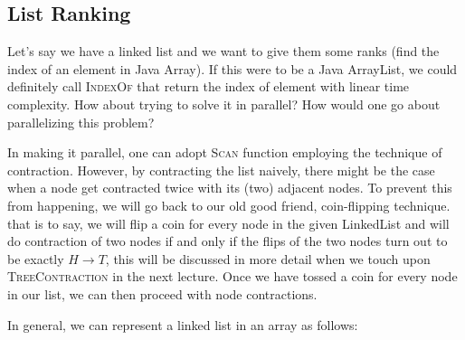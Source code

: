 \documentclass[12pt]{article}
\begin{document}
\subsection{List Ranking}
Let's say we have a linked list and we want to give them some ranks (find the index of an element in Java Array). If this were to be a Java ArrayList, we could definitely call \textsc{IndexOf} that return the index of element with linear time complexity. How about trying to solve it in parallel? How would one go about parallelizing this problem? 

In making it parallel, one can adopt \textsc{Scan} function employing the technique of contraction. However, by contracting the list naively, there might be the case when a node get contracted twice with its (two) adjacent nodes. To prevent this from happening, we will go back to our old good friend, coin-flipping technique. that is to say, we will flip a coin for every node in the given LinkedList and will do contraction of two nodes if and only if the flips of the two nodes turn out to be exactly $ H \rightarrow T$, this will be discussed in more detail when we touch upon \textsc{TreeContraction} in the next lecture. Once we have tossed a coin for every node in our list, we can then proceed with node contractions.
 
In general, we can represent a linked list in an array as follows:
\end{document}
